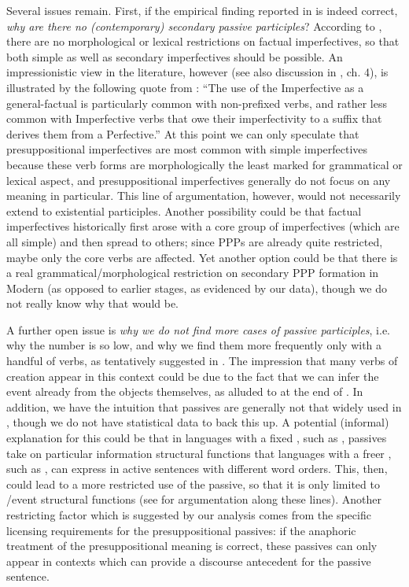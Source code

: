 \documentclass[output=paper,modfonts,newtxmath,hidelinks]{langscibook}
\begin{document}
Several issues remain. First, if the empirical finding reported in  is indeed correct, \textit{why are there no (contemporary) secondary   passive participles}? According to \citet{gronndiss}, there are no morphological or lexical restrictions on factual imperfectives, so that both simple as well as secondary imperfectives should be possible. An impressionistic view in the literature, however (see also discussion in \citealt{gronndiss}, ch. 4), is illustrated by the following quote from \citet[][118]{comrie76}: ``The use of the Imperfective as a general-factual is particularly common with non-prefixed verbs, and rather less common with Imperfective verbs that owe their imperfectivity to a suffix that derives them from a Perfective.'' At this point we can only speculate that presuppositional imperfectives are most common with simple imperfectives because these verb forms are morphologically the least marked for grammatical or lexical aspect, and presuppositional imperfectives  generally do not focus on any  meaning in particular. This line of argumentation, however, would not necessarily extend to existential  participles. Another possibility could be that factual imperfectives historically first arose with a core group of imperfectives (which are all simple) and then spread to others; since  PPPs are already quite restricted, maybe only the core verbs are affected. Yet another option could be that there is a real grammatical/morphological restriction on secondary  PPP formation in Modern  (as opposed to earlier stages, as evidenced by our data), though we do not really know why that would be.

A further open issue is \textit{why we do not find more cases of   passive participles}, i.e. why the number is so low, and why we find them more frequently only with a handful of verbs, as tentatively suggested in . The impression that many verbs of creation appear in this context could be due to the fact that we can infer the event already from the objects themselves, as alluded to at the end of . In addition, we have the intuition that passives are generally not that widely used in , though we do not have statistical data to back this up. A potential (informal) explanation for this could be that in languages with a fixed , such as , passives take on particular information structural functions that languages with a freer , such as , can express in active sentences with different word orders. This, then, could lead to a more restricted use of the passive, so that it is only limited to /event structural functions (see \citealt{abraham06} for argumentation along these lines). Another restricting factor which is suggested by our analysis comes from the specific licensing requirements for the presuppositional  passives: if the anaphoric treatment of the presuppositional meaning is correct, these passives can only appear in contexts which can provide a discourse antecedent for the passive sentence.
\end{document}
